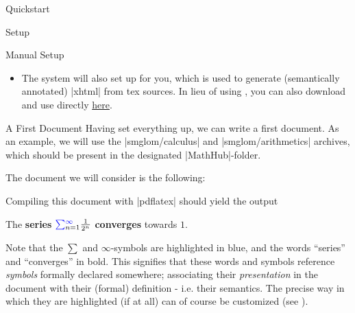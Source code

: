 \begin{sfragment}{Quickstart}
\begin{sfragment}{Setup}
\begin{sfragment}{Manual Setup}
\begin{itemize}
          Once set up, we can run |mmt| in a shell and download an archive along with
          all of its dependencies like this: |lmh install <name-of-repository>|,
          or a whole \emph{group} of archives; for example,
          |lmh install smglom| will download all smglom archives.
        \item \textbf{\RusTeX} The \mmt system will also set up \RusTeX for you,
          which is used to generate (semantically annotated)
          |xhtml| from tex sources. In lieu of using \mmt, you
          can also download and use \RusTeX directly
          \href{https://github.com/slatex/RusTeX}{here}.

      \end{itemize}
    \end{sfragment}
	\end{sfragment}
	\begin{sfragment}{A First \sTeX Document}
    Having set everything up, we can write a first
    \sTeX document. As an example, we will use the
    |smglom/calculus| and |smglom/arithmetics| archives, 
    which should be present in the designated |MathHub|-folder.

    The document we will consider is the following:
    \begin{framed}\end{framed}

    Compiling this document with |pdflatex| should yield
    the output

    \begin{framed}
        The \textbf{series} 
        $\textcolor{blue}{\sum}_{n=1}^{\textcolor{blue}\infty} $
        \textbf{converges} towards $1$.
    \end{framed}

    Note that the $\sum$ and $\infty$-symbols are highlighted in blue,
    and the words ``series'' and ``converges'' in bold.
    This signifies that these words and symbols 
    reference \sTeX \emph{symbols}
    formally declared somewhere; associating their 
    \emph{presentation} in the document with their (formal)
    definition - i.e. their semantics. The precise way
    in which they are highlighted (if at all) can of course
    be customized (see ).


\end{sfragment}
\end{sfragment}
